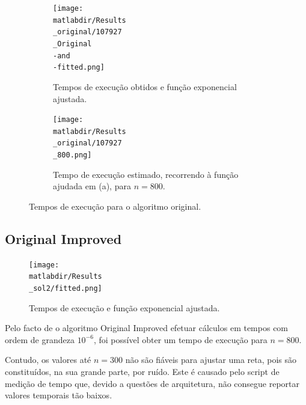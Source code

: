 \documentclass[portuguese,11pt,a4paper,titlepage]{article}
\newcommand{\matlabdir}{"../MATLAB fittings"}
\begin{document}
\begin{figure}[h]
	\begin{subfigure}{0.47\textwidth}
	\texttt{[image: \\matlabdir/Results\\\_original/107927\\\_Original\\-and\\-fitted.png]} 
	\caption{Tempos de execução obtidos e função exponencial ajustada.}
	\label{fig:subim1}
	\end{subfigure}
	\hspace{0.049\textwidth}
	\begin{subfigure}{0.47\textwidth}
	\texttt{[image: \\matlabdir/Results\\\_original/107927\\\_800.png]}
	\caption{Tempo de execução estimado, recorrendo à função ajudada em (a), para \begin{math}n=800\end{math}.}
	\label{fig:original_800}
	\end{subfigure}
	
	\caption{Tempos de execução para o algoritmo original.}
	\vspace{-20pt}
	\label{fig:original}
\end{figure}

\subsection{Original Improved}
\begin{figure}
	\vspace{-13pt}
	\texttt{[image: \\matlabdir/Results\\\_sol2/fitted.png]}
	\caption{Tempos de execução e função exponencial ajustada.}
	\label{fig:sol2}
\end{figure}
	
Pelo facto de o algoritmo Original Improved efetuar cálculos em tempos com ordem de grandeza
\begin{math}10^{-6}\end{math}, foi possível obter um tempo de execução para \begin{math}n = 800\end{math}.

Contudo, os valores até \begin{math}n = 300\end{math} não são fiáveis para ajustar uma reta,
pois são constituídos, na sua grande parte, por ruído.
Este é causado pelo script de medição de tempo que, devido a questões de arquitetura,
não consegue reportar valores temporais tão baixos.
\end{document}
